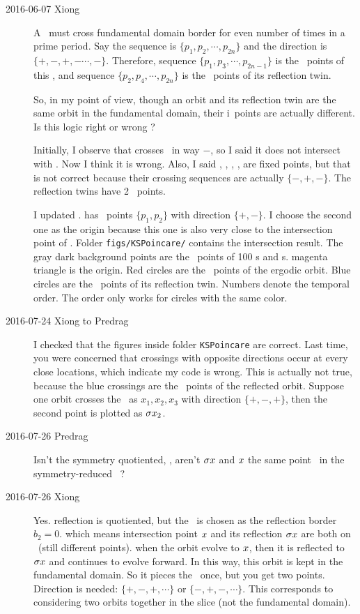 \begin{description}
\item[2016-06-07 Xiong]
A \rpo\ must cross fundamental domain border for even number of times in a prime
period. Say the sequence is $\{p_1, p_2,\cdots,p_{2n}\}$ and the direction is
$\{+,-,+,-\cdots, -\}$. Therefore, sequence  $\{p_1, p_3,\cdots,p_{2n-1}\}$
is the \PoincSec\ points of this \rpo, and sequence
$\{p_2, p_4,\cdots,p_{2n}\}$ is the  \PoincSec\ points of its
reflection twin.

So, in my point of view, though an orbit and its reflection twin are the
same orbit in the fundamental domain, their i\PoincSec\ points are
actually different. Is this logic right or wrong ?

Initially, I observe that  crosses \PoincSec\ in way $-$, so I said it
does not intersect with \PoincSec. Now I think it is wrong. Also, I said
, , , ,  are fixed points, but that is not
correct because their crossing sequences are actually $\{-, +, -\}$. The
reflection twins have 2 \PoincSec\ points.

I updated .  has \PoincSec\ points
$\{p_1, p_2\}$ with direction $\{+, -\}$. I choose the second one as the origin
because this one is also very close to the intersection point of .
Folder \texttt{figs/KSPoincare/} contains the intersection result. The gray dark
background points are the \PoincSec\ points of 100 \rpo s and \ppo s. magenta triangle is
the origin. Red circles are the \PoincSec\ points of the ergodic orbit. Blue circles are
the \PoincSec\ points of its reflection twin. Numbers denote the temporal order.
The order only works for circles with the same color.

\item[2016-07-24 Xiong to Predrag]
I checked that the figures inside folder \texttt{KSPoincare} are correct.
Last time, you were concerned that crossings with opposite directions occur
at every close locations, which indicate my code is wrong. This is actually
not true, because the blue crossings are the \PoincSec\ points of the reflected
orbit. Suppose one orbit crosses the \PoincSec\ as $x_1, x_2, x_3$ with direction
$\{+, -, +\}$, then the
second point is plotted as $\sigma x_2$.

\item[2016-07-26 Predrag]
Isn't the  symmetry quotiented, \ie, aren't $\sigma x$ and $x$
the same point \sspRed\ in the symmetry-reduced \statesp\ \pSRed?

\item[2016-07-26 Xiong]
Yes. reflection is quotiented, but the \PoincSec\ is chosen as the
reflection border $b_2 = 0$. which means intersection point $x$
and its reflection $\sigma x$ are both on \PoincSec\ (still different
points). when the orbit evolve to $x$, then it is reflected to
$\sigma x$ and continues to evolve forward. In this way,
this orbit is kept in the fundamental domain. So
it pieces the \PoincSec\ once, but you get two points.
Direction is needed: $\{+, -, +, \cdots\}$ or $\{-, +, -,\cdots\}$.
This corresponds to considering two orbits together in the slice
(not the fundamental domain).



\end{description}
